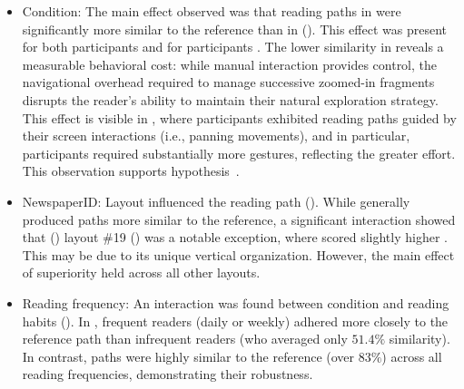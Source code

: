 \begin{itemize}
    \item {Condition:} The main effect observed was that reading paths in \condtwonot were significantly more similar to the reference than in \condonenot {} (). This effect was present for both participants \NV {} and for participants \LV {}. The lower similarity in \condonenot reveals a measurable behavioral cost: while manual interaction provides control, the navigational overhead required to manage successive zoomed-in fragments disrupts the reader's ability to maintain their natural exploration strategy.
    This effect is visible in , where participants exhibited reading paths guided by their screen interactions (i.e., panning movements), and in particular, participants \LV required substantially more gestures, reflecting the greater effort. This observation supports hypothesis~\hyppath.

    \item {NewspaperID:} Layout influenced the reading path (). While \condtwonot generally produced paths more similar to the reference, a significant interaction showed that () layout \#19 () was a notable exception, where \condonenot scored slightly higher . This may be due to its unique vertical organization. However, the main effect of \condtwonot superiority held across all other layouts.

    \item {Reading frequency:} An interaction was found between condition and reading habits (). In \condonenot, frequent readers (daily or weekly) adhered more closely to the reference path than infrequent readers (who averaged only $51.4\%$ similarity). In contrast, \condtwonot paths were highly similar to the reference (over $83\%$) across all reading frequencies, demonstrating their robustness.
    
\end{itemize}

